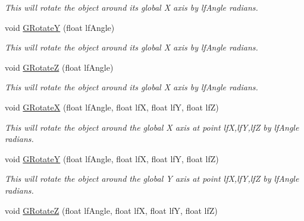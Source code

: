 \begin{DoxyCompactItemize}
\begin{DoxyCompactList}\small\item\em This will rotate the object around its global X axis by lfAngle radians. \end{DoxyCompactList}\item 
\hypertarget{classc_matrix4_a0ae1a3c85f3b00127217b67c7d75a7cc}{
void \hyperlink{classc_matrix4_a0ae1a3c85f3b00127217b67c7d75a7cc}{GRotateY} (float lfAngle)}
\label{classc_matrix4_a0ae1a3c85f3b00127217b67c7d75a7cc}

\begin{DoxyCompactList}\small\item\em This will rotate the object around its global X axis by lfAngle radians. \end{DoxyCompactList}\item 
\hypertarget{classc_matrix4_a1d082ca0f1c634d262309eb75a9e2df5}{
void \hyperlink{classc_matrix4_a1d082ca0f1c634d262309eb75a9e2df5}{GRotateZ} (float lfAngle)}
\label{classc_matrix4_a1d082ca0f1c634d262309eb75a9e2df5}

\begin{DoxyCompactList}\small\item\em This will rotate the object around its global X axis by lfAngle radians. \end{DoxyCompactList}\item 
\hypertarget{classc_matrix4_a517140950c736c74a44d34704b44c83d}{
void \hyperlink{classc_matrix4_a517140950c736c74a44d34704b44c83d}{GRotateX} (float lfAngle, float lfX, float lfY, float lfZ)}
\label{classc_matrix4_a517140950c736c74a44d34704b44c83d}

\begin{DoxyCompactList}\small\item\em This will rotate the object around the global X axis at point lfX,lfY,lfZ by lfAngle radians. \end{DoxyCompactList}\item 
\hypertarget{classc_matrix4_a5b1505c43d9382bc625fc1eb53d44360}{
void \hyperlink{classc_matrix4_a5b1505c43d9382bc625fc1eb53d44360}{GRotateY} (float lfAngle, float lfX, float lfY, float lfZ)}
\label{classc_matrix4_a5b1505c43d9382bc625fc1eb53d44360}

\begin{DoxyCompactList}\small\item\em This will rotate the object around the global Y axis at point lfX,lfY,lfZ by lfAngle radians. \end{DoxyCompactList}\item 
\hypertarget{classc_matrix4_a5b357f5686b74e0feeff7eaae070f566}{
void \hyperlink{classc_matrix4_a5b357f5686b74e0feeff7eaae070f566}{GRotateZ} (float lfAngle, float lfX, float lfY, float lfZ)}
\label{classc_matrix4_a5b357f5686b74e0feeff7eaae070f566}


\end{DoxyCompactItemize}
